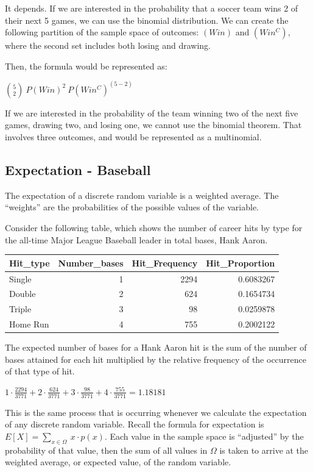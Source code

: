 \documentclass[
  11pt,
]{book}
\theoremstyle{definition}
\theoremstyle{definition}
\theoremstyle{definition}
\theoremstyle{definition}
\theoremstyle{remark}
\begin{document}
It depends. If we are interested in the probability that a soccer team wins 2 of their next 5 games, we can use the binomial distribution. We can create the following partition of the sample space of outcomes: \((Win)\) and \((Win^C)\), where the second set includes both losing and drawing.

Then, the formula would be represented as:

\(\binom{5}{2}\ P(Win)^2\  P(Win^C)^{(5-2)}\)

If we are interested in the probability of the team winning two of the next five games, drawing two, and losing one, we cannot use the binomial theorem. That involves three outcomes, and would be represented as a multinomial.

\hypertarget{expectation---baseball}{%
\subsection{Expectation - Baseball}\label{expectation---baseball}}

The expectation of a discrete random variable is a weighted average. The ``weights'' are the probabilities of the possible values of the variable.

Consider the following table, which shows the number of career hits by type for the all-time Major League Baseball leader in total bases, Hank Aaron.

\begin{table}
\centering
\begin{tabular}[t]{l|r|r|r}
\hline
Hit\_type & Number\_bases & Hit\_Frequency & Hit\_Proportion\\
\hline
Single & 1 & 2294 & 0.6083267\\
\hline
Double & 2 & 624 & 0.1654734\\
\hline
Triple & 3 & 98 & 0.0259878\\
\hline
Home Run & 4 & 755 & 0.2002122\\
\hline
\end{tabular}
\end{table}

The expected number of bases for a Hank Aaron hit is the sum of the number of bases attained for each hit multiplied by the relative frequency of the occurrence of that type of hit.

\(1 \cdot \frac{2294}{3771} + 2 \cdot \frac{624}{3771} + 3 \cdot \frac{98}{3771} + 4 \cdot \frac{755}{3771} = 1.18181\)

This is the same process that is occurring whenever we calculate the expectation of any discrete random variable. Recall the formula for expectation is \(E[X] = \sum_{x \in \Omega}\ x \cdot p(x)\). Each value in the sample space is ``adjusted'' by the probability of that value, then the sum of all values in \(\Omega\) is taken to arrive at the weighted average, or expected value, of the random variable.
\end{document}
